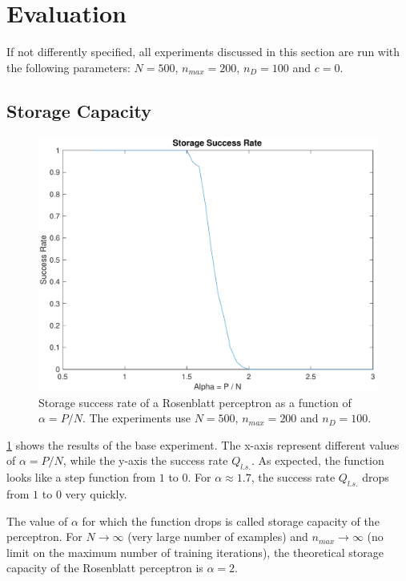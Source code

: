 \section{Evaluation}
\label{sec:evaluation}
If not differently specified, all experiments discussed in this section are run with the following parameters: $N = 500$, $n_{max} = 200$, $n_D = 100$ and $c = 0$.

\subsection{Storage Capacity}
\label{subsec:capacity}
\begin{figure}[t]
	\centering
	\includegraphics[width=\columnwidth]{figures/base}
    \caption{Storage success rate of a Rosenblatt perceptron as a function of $\alpha = P / N$. The experiments use $N = 500$, $n_{max} = 200$ and $n_D = 100$.}
	\label{fig:base}
\end{figure}
\cref{fig:base} shows the results of the base experiment.
The x-axis represent different values of $\alpha = P / N$, while the y-axis the success rate $Q_{l.s.}$.
As expected, the function looks like a step function from $1$ to $0$.
For $\alpha \approx 1.7$, the success rate $Q_{l.s.}$ drops from $1$ to $0$ very quickly. 

The value of $\alpha$ for which the function drops is called storage capacity of the perceptron.
For $N \to \infty$ (very large number of examples) and $n_{max} \to \infty$ (no limit on the maximum number of training iterations), the theoretical storage capacity of the Rosenblatt perceptron is $\alpha = 2$.

